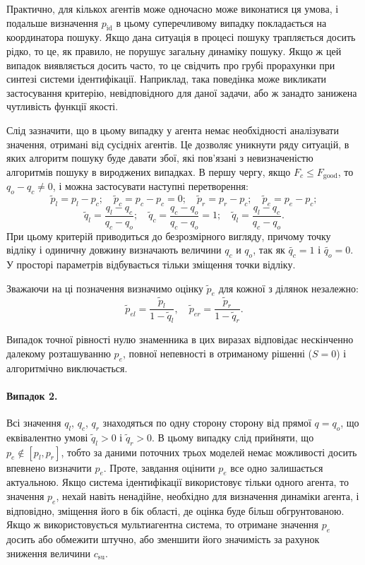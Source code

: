 Практично, для кількох агентів може одночасно може виконатися
ця умова, і подальше визначення
$ p_\mathrm{id} $ в цьому суперечливому випадку покладається на
координатора пошуку. Якщо дана ситуація в процесі пошуку
трапляється досить рідко, то це, як правило, не порушує загальну
динаміку пошуку. Якщо ж цей випадок виявляється досить часто,
то це свідчить про грубі прорахунки при синтезі системи
ідентифікації. Наприклад, така поведінка може викликати
застосування критерію, невідповідного для даної задачи,
або ж занадто занижена чутливість функції якості.

Слід зазначити, що в цьому випадку у агента немає необхідності
аналізувати значення, отримані від сусідніх агентів. Це дозволяє
уникнути ряду ситуацій, в яких алгоритм пошуку буде давати
збої, які пов'язані з невизначеністю алгоритмів пошуку в вироджених
випадках.
%
В першу чергу, якщо
$F_c \le F_\mathrm{good}$, то $q_o -q_c \ne 0$,
і можна застосувати наступні перетворення:
%
\[
  \tilde{p}_l = p_l - p_c;
  \quad
  \tilde{p}_c = p_c - p_c = 0;
  \quad
  \tilde{p}_r = p_r - p_c;
  \quad
  \tilde{p}_e = p_e - p_c;
\]
%
\begin{equation}
  \tilde{q}_l = \frac{q_l-q_c}{q_c-q_o};
  \quad
  \tilde{q}_c = \frac{q_c-q_o}{q_c-q_o} = 1;
  \quad
  \tilde{q}_l = \frac{q_l-q_c}{q_c-q_o}.
  \label{atu:eq:q_agent_rel}
\end{equation}
%
При цьому критерій приводиться до безрозмірного вигляду,
причому точку відліку і одиничну довжину визначають величини
$q_c$ и $q_o$, так як $\tilde{q_c} = 1$ і $\tilde{q_o} = 0$.
У просторі параметрів відбувається тільки зміщення точки відліку.

Зважаючи на ці позначення визначимо оцінку
$\tilde{p}_e$
для кожної з ділянок незалежно:
%
\begin{equation}
  \tilde{p}_{el} = \frac{\tilde{p}_l}{1-\tilde{q}_l},
  \quad
  \tilde{p}_{er} = \frac{\tilde{p}_r}{1-\tilde{q}_r}.
  \label{atu:eq:pr_ex}
\end{equation}

Випадок точної рівності нулю знаменника в цих виразах відповідає нескінченно
далекому розташуванню $p_e$, повної непевності в отриманому рішенні ($S = 0$)
і алгоритмічно виключається.


\paragraph{Випадок 2.} %
%
Всі значення
$q_l $, $q_c $, $q_r $ знаходяться по одну сторону сторону від прямої
$q = q_o$, що еквівалентно умові
$\tilde{q}_l> 0 $ і $\tilde{q}_r> 0 $.
В цьому випадку слід прийняти, що
$p_e \notin [p_l, p_r] $, тобто за даними поточних трьох моделей немає
можливості досить впевнено визначити
$ p_e $. Проте, завдання оцінити
$ p_e $ все одно залишається актуальною. Якщо система ідентифікації
використовує тільки одного агента, то значення
$ p_e $, нехай навіть ненадійне, необхідно для визначення динаміки
агента, і відповідно, зміщення його в бік області, де оцінка буде
більш обгрунтованою. Якщо ж використовується мультиагентна
система, то отримане значення
$ p_e $ досить або обмежити штучно, або зменшити його значимість
за рахунок зниження величини
$ c_\mathrm{su} $.

